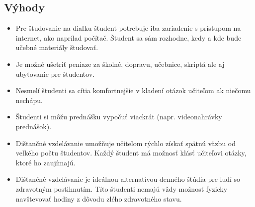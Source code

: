 \documentclass[10pt,oneside,slovak,a4paper]{article}
\begin{document}
\subsection{Výhody}
\begin{itemize}
	\item Pre študovanie na diaľku študent potrebuje iba zariadenie s prístupom na internet, ako naprílad počítač. Študent sa sám rozhodne, kedy a kde bude učebné materiály študovať.
	\item Je možné ušetriť peniaze za školné, dopravu, učebnice, skriptá ale aj ubytovanie pre študentov.
	\item Nesmelí študenti sa cítia komfortnejšie v kladení otázok učiteľom ak niečomu nechápu.
	\item Študenti si môžu prednášku vypočuť viackrát (napr. videonahrávky prednášok).
	\item Dištančné vzdelávanie umožňuje učiteľom rýchlo získať spätnú väzbu od veľkého počtu študentov. Každý študent má možnosť klásť učiteľovi otázky, ktoré ho zaujímajú.
	\item Dištančné vzdelávanie je ideálnou alternatívou denného štúdia pre ľudí so zdravotným postihnutím. Títo študenti nemajú vždy možnosť fyzicky navštevovať hodiny z dôvodu zlého zdravotného stavu. %


\end{itemize}
\end{document}
